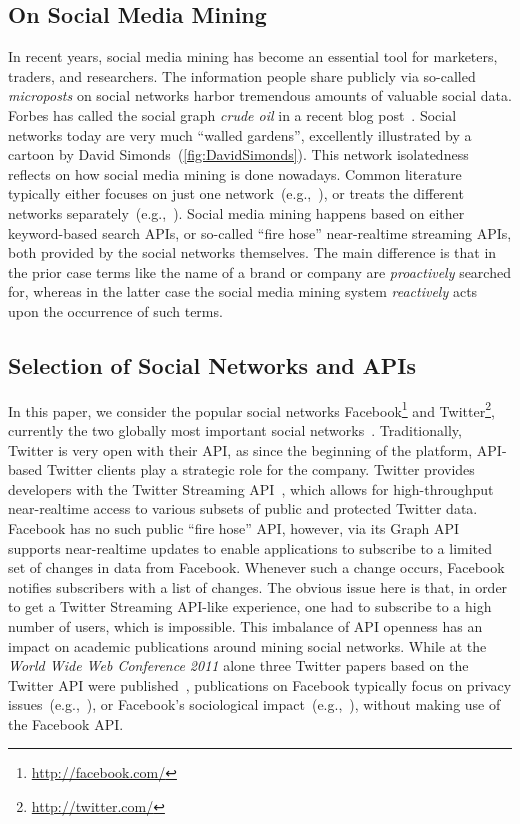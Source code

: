 \documentclass{iosart2c}
\begin{document}
\subsection{On Social Media Mining}
In recent years, social media mining has become an essential tool for marketers, traders, and researchers.
The information people share publicly via so-called \emph{microposts} on social networks harbor tremendous amounts of valuable social data.
Forbes has called the social graph \emph{crude oil} in a recent blog post~\cite{ForbesPost}.
Social networks today are very much ``walled gardens'', excellently illustrated by a cartoon by David Simonds~(\autoref{fig:DavidSimonds}).
This network isolatedness reflects on how social media mining is done nowadays.
Common literature typically either focuses on just one network~(e.g.,~\cite{russell201121}), or treats the different networks separately~(e.g.,~\cite{russell2011mining}).
Social media mining happens based on either keyword-based search APIs, or so-called ``fire hose'' near-realtime streaming APIs, both provided by the social networks themselves.
The main difference is that in the prior case terms like the name of a brand or company are \emph{proactively} searched for, whereas in the latter case the social media mining system \emph{reactively} acts upon the occurrence of such terms.

\subsection{Selection of Social Networks and APIs}
In this paper, we consider the popular social networks Facebook\footnote{\url{http://facebook.com/}} and Twitter\footnote{\url{http://twitter.com/}}, currently the two globally most important social networks~\cite{comScoreTwitter, comScoreFacebook}.
Traditionally, Twitter is very open with their API, as since the beginning of the platform, API-based Twitter clients  play a strategic role for the company.
Twitter provides developers with the Twitter Streaming API~\cite{TwitterStreamingAPI}, which allows for high-throughput near-realtime access to various subsets of public and protected Twitter data.
Facebook has no such public ``fire hose'' API, however, via its Graph API~\cite{FacebookRealtimeAPI} supports near-realtime updates to enable applications to subscribe to a limited set of changes in data from Facebook.
Whenever such a change occurs, Facebook notifies subscribers with a list of changes.
The obvious issue here is that, in order to get a Twitter Streaming API-like experience, one had to subscribe to a high number of users, which is impossible.
This imbalance of API openness has an impact on academic publications around mining social networks.
While at the \textit{World Wide Web Conference 2011} alone three Twitter papers based on the Twitter API were published~\cite{Meeder:2011:WKY:1963405.1963479, Romero:2011:DMI:1963405.1963503, Wu:2011:SWT:1963405.1963504}, publications on Facebook typically focus on privacy issues~(e.g.,~\cite{liu:settings}), or Facebook's sociological impact~(e.g.,~\cite{JCC4:JCC4367}), without making use of the Facebook API.
\end{document}
